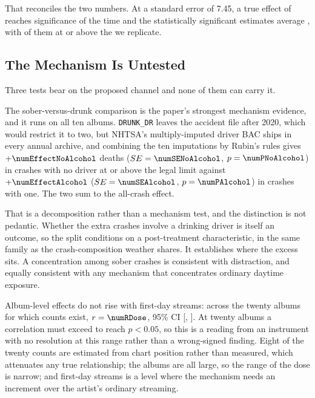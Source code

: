 \documentclass[11pt]{article}
\begin{document}
That reconciles the two numbers. At a standard error of 7.45, a true effect of
\numEffectOutsidePaper{} reaches significance \numPowerAtOutside{} of the time and the statistically significant
estimates average \numMeanPublishedAtOutside{}, with \numPReachReplicated{} of them at or above the
\numEffectRegression{} we replicate.



\subsection{The Mechanism Is Untested}

Three tests bear on the proposed channel and none of them can carry it.

The sober-versus-drunk comparison is the paper's strongest mechanism evidence, and it runs on all
ten albums. \texttt{DRUNK\_DR} leaves the accident file after 2020, which would restrict it to
two, but NHTSA's multiply-imputed driver BAC ships in every annual archive, and combining the ten imputations by Rubin's rules gives $+\numEffectNoAlcohol$ deaths
($SE = \numSENoAlcohol$, $p = \numPNoAlcohol$) in crashes with no driver at or above the legal
limit against $+\numEffectAlcohol$ ($SE = \numSEAlcohol$, $p = \numPAlcohol$) in crashes with one.
The two sum to the all-crash effect.

That is a decomposition rather than a mechanism test, and the distinction is not pedantic. Whether
the extra crashes involve a drinking driver is itself an outcome, so the split conditions on a
post-treatment characteristic, in the same family as the crash-composition weather shares. It
establishes where the excess sits. A concentration among sober crashes is consistent with
distraction, and equally consistent with any mechanism that concentrates ordinary daytime
exposure.

Album-level effects do not rise with first-day streams: across the twenty albums for which counts
exist, $r = \numRDose$, 95\% CI [\numRDoseLo, \numRDoseHi]. At twenty albums a correlation must
exceed \numRDoseMinDetectable{} to reach $p < 0.05$, so this is a reading from an instrument with
no resolution at this range rather than a wrong-signed finding. Eight of the twenty counts are
estimated from chart position rather than measured, which attenuates any true relationship; the
albums are all large, so the range of the dose is narrow; and first-day streams is a level where
the mechanism needs an increment over the artist's ordinary streaming.
\end{document}
